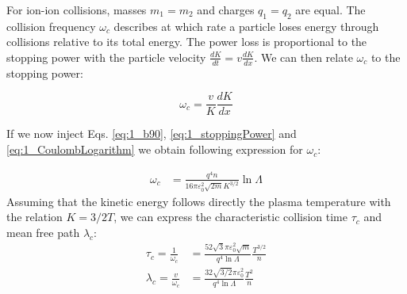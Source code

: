 For ion-ion collisions, masses $m_1 = m_2$ and charges $q_1 = q_2$ are equal. The collision frequency $\omega_c$ describes at which rate a particle loses energy through collisions relative to its total energy. The power loss is proportional to the stopping power with the particle velocity $\frac{dK}{dt} = v\frac{dK}{dx}$. We can then relate $\omega_c$ to the stopping power:

\begin{equation}
		\omega_c = \frac{v}{K}\frac{dK}{dx}
\end{equation}

If we now inject Eqs. \ref{eq:1_b90}, \ref{eq:1_stoppingPower} and \ref{eq:1_CoulombLogarithm} we obtain following expression for $\omega_c$:

\begin{align}
	\omega_c&= \frac{q^4 n}{16\pi \varepsilon_0^2 \sqrt{2m}K^{3/2}}\ln\Lambda \label{eq:1_collisionFrequency}
\end{align}
Assuming that the kinetic energy follows directly the plasma temperature with the relation $K = 3/2T$, we can express the characteristic collision time $\tau_c$ and mean free path $\lambda_c$:
\begin{align}
	\tau_c = \frac{1}{\omega_c} &= \frac{52\sqrt{3}\pi \varepsilon_0^2\sqrt{m}}{q^4 \ln\Lambda} \frac{T^{3/2}}{n}\label{eq:1_collisionTime} \\
	\lambda_c = \frac{v}{\omega_c} &= \frac{32 \sqrt{3/2}\pi \varepsilon_0^2}{q^4 \ln\Lambda}\frac{T^2}{n} \label{eq:1_meanFreePath}
\end{align}

